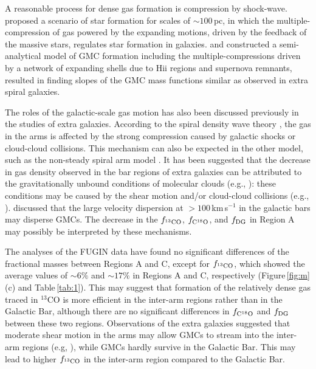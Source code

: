 \documentclass[proof]{pasj01}
\newcommand{\fDG}{f_{\rm DG}}
\newcommand{\fthree}{f_{\rm ^{13}CO}}
\newcommand{\feight}{f_{\rm C^{18}O}}
\begin{document}
A reasonable process for dense gas formation is compression by shock-wave.
\citet{inu2015} proposed a scenario of star formation for scales of $\sim100$\,pc, in which the multiple-compression of gas powered by the expanding motions, driven by the feedback of the massive stars, regulates star formation in galaxies.
\citet{kob2017a} and \citet{kob2017b} constructed a semi-analytical model of GMC formation including the multiple-compressions driven by a network of expanding shells due to H{\sc ii} regions and supernova remnants, resulted in finding slopes of the GMC mass functions similar as observed in extra spiral galaxies.

The roles of the galactic-scale gas motion has also been discussed previously in the studies of extra galaxies.
According to the spiral density wave theory \citep{shu2016}, the gas in the arms is affected by the strong compression caused by galactic shocks or cloud-cloud collisions. This mechanism can also be expected in the other model, such as the non-steady spiral arm model \citep{wad2011, bab2013, dob2014}.
It has been suggested that the decrease in gas density observed in the bar regions of extra galaxies can be attributed to the gravitationally unbound conditions of molecular clouds (e.g., \cite{sor2012, mei2013}): these conditions may be caused by the shear motion and/or cloud-cloud collisions (e.g., \cite{fuj2014}). 
\citet{yaj2018} discussed that the large velocity dispersion at $> 100$\,km\,s$^{-1}$ in the galactic bars may disperse GMCs. 
The decrease in the $\fthree$, $\feight$, and $\fDG$ in Region A may possibly be interpreted by these mechanisms.

The analyses of the FUGIN data have found no significant differences of the fractional masses between Regions A and C, except for $\fthree$, which showed the average values of $\sim6\%$ and $\sim17\%$ in Regions A and C, respectively (Figure\,\ref{fig:m}(c) and Table\,\ref{tab:1}).
This may suggest that formation of the relatively dense gas traced in $^{13}$CO is more efficient in the inter-arm regions rather than in the Galactic Bar, although there are no significant differences in $\feight$ and $\fDG$ between these two regions.
Observations of the extra galaxies suggested that moderate shear motion in the arms may allow GMCs to stream into the inter-arm regions (e.g, \cite{kod2009, miy2014}), while GMCs hardly survive in the Galactic Bar.
This may lead to higher $\fthree$ in the inter-arm region compared to the Galactic Bar.
\end{document}
